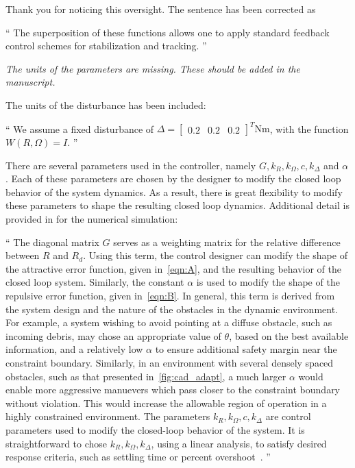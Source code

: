 \documentclass[11pt]{article}
\newenvironment{correction}{\begin{list}{}{\setlength{\leftmargin}{1cm}\setlength{\rightmargin}{1cm}}\vspace{\parsep}\item[]``}{''\end{list}}
\begin{document}
\begin{enumerate}
Thank you for noticing this oversight. 
The sentence has been corrected as
\begin{correction}
    The superposition of these functions allows one to apply standard feedback control schemes for stabilization and tracking.
\end{correction}

\item \textit{The units of the parameters are missing. These should be added in the manuscript.}

The units of the disturbance has been included:
\begin{correction}
    We assume a fixed disturbance of \(\Delta = \begin{bmatrix} 0.2 & 0.2 & 0.2 \end{bmatrix}^T \si{\newton\meter}\), with the function \( W(R,\Omega) = I \).
\end{correction}

There are several parameters used in the controller, namely \( G, k_R, k_\Omega, c, k_\Delta\) and \(\alpha\).
Each of these parameters are chosen by the designer to modify the closed loop behavior of the system dynamics. 
As a result, there is great flexibility to modify these parameters to shape the resulting closed loop dynamics. 
Additional detail is provided in for the numerical simulation:
\begin{correction}
    The diagonal matrix \( G \) serves as a weighting matrix for the relative difference between \( R \) and \( R_d \). 
    Using this term, the control designer can modify the shape of the attractive error function, given in~\cref{eqn:A}, and the resulting behavior of the closed loop system.
    Similarly, the constant \( \alpha \) is used to modify the shape of the repulsive error function, given in~\cref{eqn:B}.
    In general, this term is derived from the system design and the nature of the obstacles in the dynamic environment.
    For example, a system wishing to avoid pointing at a diffuse obstacle, such as incoming debris, may chose an appropriate value of \( \theta \), based on the best available information, and a relatively low \( \alpha \) to ensure additional safety margin near the constraint boundary. 
    Similarly, in an environment with several densely spaced obstacles, such as that presented in~\cref{fig:cad_adapt}, a much larger \( \alpha \) would enable more aggressive manuevers which pass closer to the constraint boundary without violation.
    This would increase the allowable region of operation in a highly constrained environment.
    The parameters \( k_R, k_\Omega, c, k_\Delta\) are control parameters used to modify the closed-loop behavior of the system.
    It is straightforward to chose \( k_R, k_\Omega, k_\Delta\), using a linear analysis, to satisfy desired response criteria, such as settling time or percent overshoot~\cite{nise2007}.
\end{correction}


\end{enumerate}
\end{document}
